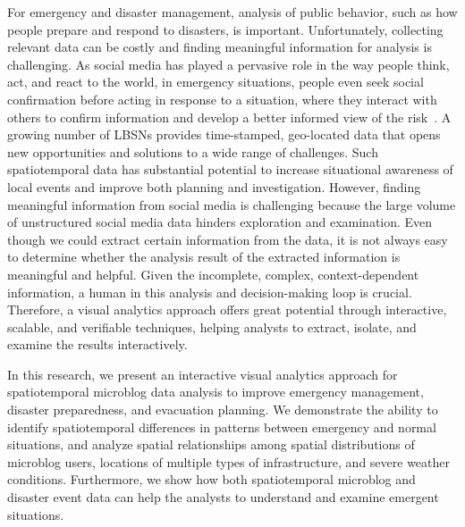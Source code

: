 For emergency and disaster management, analysis of public behavior, such as how people prepare and respond to disasters, is important.
Unfortunately, collecting relevant data can be costly and finding meaningful information for analysis is challenging. 
As social media has played a pervasive role in the way people think, act, and react to the world, 
in emergency situations, people even seek social confirmation before acting in response to a situation, where they interact with others to confirm information and develop a better informed view of the risk~\cite{national:2013:Public}.
A growing number of LBSNs provides time-stamped, geo-located data that opens new opportunities and solutions to a wide range of challenges.
Such spatiotemporal data has substantial potential to increase situational awareness of local events and improve both planning and investigation. 
However, finding meaningful information from social media is challenging because the large volume of unstructured social media data hinders exploration and examination.
Even though we could extract certain information from the data, it is not always easy to determine whether the analysis result of the extracted information is meaningful and helpful.
Given the incomplete, complex, context-dependent information, a human in this analysis and decision-making loop is crucial.
Therefore, a visual analytics approach offers great potential through interactive, scalable, and verifiable techniques, helping analysts to extract, isolate, and examine the results interactively.

In this research, we present an interactive visual analytics approach for spatiotemporal microblog data analysis to improve emergency management, disaster preparedness, and evacuation planning. 
We demonstrate the ability to identify spatiotemporal differences in patterns between emergency and normal situations, and analyze spatial relationships among spatial distributions of microblog users, locations of multiple types of infrastructure, and severe weather conditions.
Furthermore, we show how both spatiotemporal microblog and disaster event data can help the analysts to understand and examine emergent situations.


